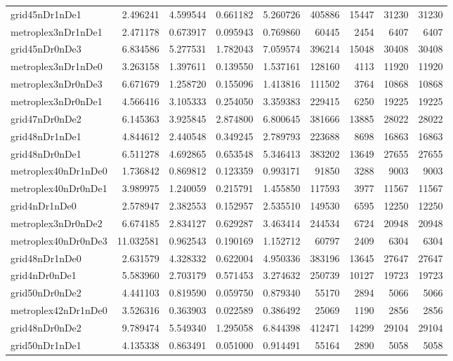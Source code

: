 \begin{longtable}{|l|r|r|r|r|r|r|r|r|}
grid45nDr1nDe1 & 2.496241 & 4.599544 & 0.661182 & 5.260726 & 405886 & 15447 & 31230 & 31230 \\
metroplex3nDr1nDe1 & 2.471178 & 0.673917 & 0.095943 & 0.769860 & 60445 & 2454 & 6407 & 6407 \\
grid45nDr0nDe3 & 6.834586 & 5.277531 & 1.782043 & 7.059574 & 396214 & 15048 & 30408 & 30408 \\
metroplex3nDr1nDe0 & 3.263158 & 1.397611 & 0.139550 & 1.537161 & 128160 & 4113 & 11920 & 11920 \\
metroplex3nDr0nDe3 & 6.671679 & 1.258720 & 0.155096 & 1.413816 & 111502 & 3764 & 10868 & 10868 \\
metroplex3nDr0nDe1 & 4.566416 & 3.105333 & 0.254050 & 3.359383 & 229415 & 6250 & 19225 & 19225 \\
grid47nDr0nDe2 & 6.145363 & 3.925845 & 2.874800 & 6.800645 & 381666 & 13885 & 28022 & 28022 \\
grid48nDr1nDe1 & 4.844612 & 2.440548 & 0.349245 & 2.789793 & 223688 & 8698 & 16863 & 16863 \\
grid48nDr0nDe1 & 6.511278 & 4.692865 & 0.653548 & 5.346413 & 383202 & 13649 & 27655 & 27655 \\
metroplex40nDr1nDe0 & 1.736842 & 0.869812 & 0.123359 & 0.993171 & 91850 & 3288 & 9003 & 9003 \\
metroplex40nDr0nDe1 & 3.989975 & 1.240059 & 0.215791 & 1.455850 & 117593 & 3977 & 11567 & 11567 \\
grid4nDr1nDe0 & 2.578947 & 2.382553 & 0.152957 & 2.535510 & 149530 & 6595 & 12250 & 12250 \\
metroplex3nDr0nDe2 & 6.674185 & 2.834127 & 0.629287 & 3.463414 & 244534 & 6724 & 20948 & 20948 \\
metroplex40nDr0nDe3 & 11.032581 & 0.962543 & 0.190169 & 1.152712 & 60797 & 2409 & 6304 & 6304 \\
grid48nDr1nDe0 & 2.631579 & 4.328332 & 0.622004 & 4.950336 & 383196 & 13645 & 27647 & 27647 \\
grid4nDr0nDe1 & 5.583960 & 2.703179 & 0.571453 & 3.274632 & 250739 & 10127 & 19723 & 19723 \\
grid50nDr0nDe2 & 4.441103 & 0.819590 & 0.059750 & 0.879340 & 55170 & 2894 & 5066 & 5066 \\
metroplex42nDr1nDe0 & 3.526316 & 0.363903 & 0.022589 & 0.386492 & 25069 & 1190 & 2856 & 2856 \\
grid48nDr0nDe2 & 9.789474 & 5.549340 & 1.295058 & 6.844398 & 412471 & 14299 & 29104 & 29104 \\
grid50nDr1nDe1 & 4.135338 & 0.863491 & 0.051000 & 0.914491 & 55164 & 2890 & 5058 & 5058 \\

\end{longtable}
